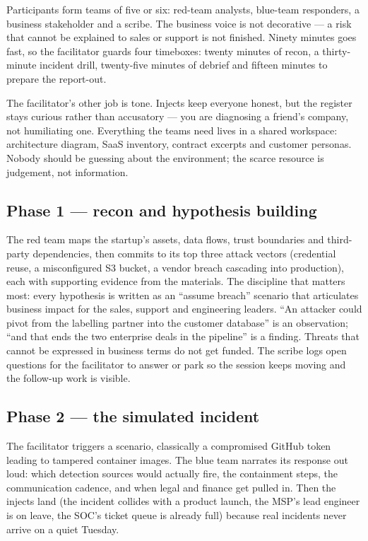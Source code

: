 Participants form teams of five or six: red-team analysts, blue-team responders, a business stakeholder and a scribe. The business voice is not decorative — a risk that cannot be explained to sales or support is not finished. Ninety minutes goes fast, so the facilitator guards four timeboxes: twenty minutes of recon, a thirty-minute incident drill, twenty-five minutes of debrief and fifteen minutes to prepare the report-out.


The facilitator's other job is tone. Injects keep everyone honest, but the register stays curious rather than accusatory — you are diagnosing a friend's company, not humiliating one. Everything the teams need lives in a shared workspace: architecture diagram, SaaS inventory, contract excerpts and customer personas. Nobody should be guessing about the environment; the scarce resource is judgement, not information.



\subsection{Phase 1 — recon and hypothesis building}


The red team maps the startup's assets, data flows, trust boundaries and third-party dependencies, then commits to its top three attack vectors (credential reuse, a misconfigured S3 bucket, a vendor breach cascading into production), each with supporting evidence from the materials. The discipline that matters most: every hypothesis is written as an ``assume breach'' scenario that articulates business impact for the sales, support and engineering leaders. ``An attacker could pivot from the labelling partner into the customer database'' is an observation; ``and that ends the two enterprise deals in the pipeline'' is a finding. Threats that cannot be expressed in business terms do not get funded. The scribe logs open questions for the facilitator to answer or park so the session keeps moving and the follow-up work is visible.



\subsection{Phase 2 — the simulated incident}


The facilitator triggers a scenario, classically a compromised GitHub token leading to tampered container images. The blue team narrates its response out loud: which detection sources would actually fire, the containment steps, the communication cadence, and when legal and finance get pulled in. Then the injects land (the incident collides with a product launch, the MSP's lead engineer is on leave, the SOC's ticket queue is already full) because real incidents never arrive on a quiet Tuesday.


